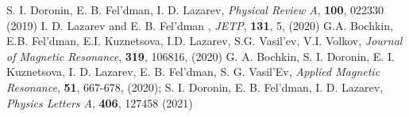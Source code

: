  S. I. Doronin, E. B. Fel'dman,  I. D. Lazarev, \textit{Physical Review A}, \textbf{100}, 022330 (2019)
 I. D. Lazarev and E. B. Fel'dman , \textit{JETP}, \textbf{131}, 5, (2020)
 G.A. Bochkin, E.B. Fel'dman, E.I. Kuznetsova, I.D. Lazarev, S.G. Vasil'ev, V.I. Volkov, \textit{Journal of Magnetic Resonance}, \textbf{319}, 106816, (2020)
 G. A. Bochkin, S. I. Doronin, E. I. Kuznetsova, I. D. Lazarev, E. B. Fel’dman, S. G. Vasil’Ev, \textit{Applied Magnetic Resonance}, \textbf{51}, 667-678, (2020);
 S. I. Doronin, E. B. Fel'dman,  I. D. Lazarev, \textit{Physics Letters A}, \textbf{406}, 127458 (2021)